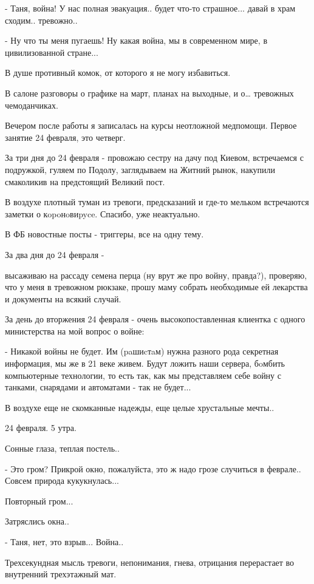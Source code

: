 - Таня, война! У нас полная эвакуация.. будет что-то страшное... давай в храм
сходим.. тревожно..

- Ну что ты меня пугаешь! Ну какая война, мы в современном мире, в
цивилизованной стране...

В душе противный комок, от которого я не могу избавиться. 

В салоне разговоры о графике на март, планах на выходные, и о… тревожных
чемоданчиках. 

Вечером после работы я записалась на курсы неотложной медпомощи. Первое занятие
24 февраля, это четверг.

За три дня до 24 февраля - провожаю сестру на дачу под Киевом, встречаемся с
подружкой, гуляем по Подолу, заглядываем на Житний рынок, накупили смаколикив
на предстоящий Великий пост.

В воздухе плотный туман из тревоги, предсказаний и где-то мельком встречаются
заметки о кopoнoвиpyce. Спасибо, уже неактуально.

В ФБ новостные посты - триггеры, все на одну тему. 

За два дня до 24 февраля - 

высаживаю на рассаду семена перца (ну врут же про войну, правда?), проверяю,
что у меня в тревожном рюкзаке, прошу маму собрать необходимые ей лекарства и
документы на всякий случай. 

За день до вторжения 24 февраля - очень высокопоставленная клиентка с одного
министерства на мой вопрос о войне:

- Никакой войны не будет. Им (paшиcтaм) нужна разного рода секретная
информация, мы же в 21 веке живем. Будут ложить наши сервера, бoмбить
компьютерные технологии, то есть так, как мы представляем себе войну с танками,
снарядами и автоматами - так не будет...

В воздухе еще не скомканные надежды, еще целые хрустальные мечты.. 

24 февраля. 5 утра.

Сонные глаза, теплая постель..

- Это гром? Прикрой окно, пожалуйста, это ж надо грозе случиться в феврале..
Совсем природа кукукнулась...

Повторный гром... 

Затряслись окна..

- Таня, нет, это взрыв... Война..

Трехсекундная мысль тревоги, непонимания, гнева, отрицания перерастает во
внутренний трехэтажный мат.

